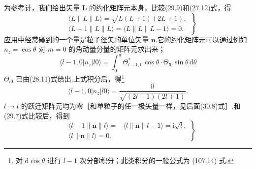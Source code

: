 为参考计，我们给出矢量 $\boldsymbol{L}$ 的约化矩阵元本身，比较(29.9)和(27.12)式，得
\begin{equation}
\left.\begin{aligned}
  &\langle L\parallel L\parallel L\rangle
  =\sqrt{L(L+1)(2L+1)},\\
  &\langle L-1\parallel L\parallel L\rangle
  =\langle L\parallel L\parallel L-1\rangle=0.
\end{aligned}\right\}
\end{equation}
应用中经常碰到的一个量是粒子径矢的单位矢量 $\boldsymbol{n}$.它的约化矩阵元可以通过例如 $n_z=\cos\theta$ 对 $m=0$ 的角动量分量的矩阵元求出来；
\begin{equation*}
  \langle l-1,0|n_z|l0\rangle
  =\int_0^{\pi}\varTheta_{l-1,0}^{*}\cos\theta\cdot\varTheta_{l0}\sin\theta\,\mathrm{d}\theta
\end{equation*}
$\varTheta_{l0}$ 已由(28.11)式给出.上式积分后，得\footnote{对 $\mathrm{d}\cos\theta$ 进行 $l-1$ 次分部积分；此类积分的一般公式为 (107.14) 式.}
\begin{equation*}
  \langle l-1,0|n_z|l0\rangle
  =\frac{\mathrm{i}l}{\sqrt{(2l-1)(2l+1)}}.
\end{equation*}
$l\longrightarrow l$ 的跃迁矩阵元均为零［和单粒子的任一极矢量一样，见后面(30.8)式］.和(29.7)式比较后，得到
\begin{equation}
\left.\begin{aligned}
  &\langle l-1\parallel \boldsymbol{n}\parallel l\rangle
  =-\langle l\parallel \boldsymbol{n}\parallel l-1\rangle
  =\mathrm{i}\sqrt{l},\\
  &\langle l\parallel \boldsymbol{n}\parallel l\rangle=0.
\end{aligned}\right\}
\end{equation}


